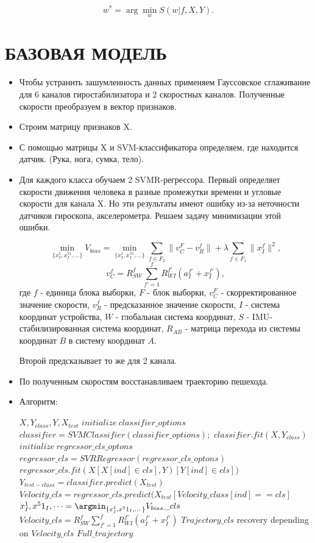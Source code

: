 \documentclass[letterpaper, 10 pt, conference]{ieeeconf}  %
\begin{document}
\[w^* = \arg\min_{w}S(w|f, X, Y).\]


\section{БАЗОВАЯ МОДЕЛЬ}
\begin{itemize}

\item Чтобы устранить зашумленность данных применяем Гауссовское сглаживание для 6 каналов гиростабилизатора и 2 скоростных каналов. Полученные скорости преобразуем в вектор признаков.
\item Строим матрицу признаков X.
\item С помощью матрицы X и SVM-классификатора определяем, где находится датчик. (Рука, нога, сумка, тело).
\item Для каждого класса обучаем 2 SVMR-регрессора. Первый определяет скорости движения человека в разные промежутки времени и угловые скорости для канала X. Но эти результаты имеют ошибку из-за неточности датчиков гироскопа, акселерометра. Решаем задачу минимизации этой ошибки.

\[\min_{\{x^1_I, x^51_I,\dots\}}V_{bias}=
\min_{\{x^1_I, x^51_I,\dots\}}\sum_{f \in F_2}\|v_C^F-v_R^f\|+
\lambda\sum_{f \in F_1}\|x^f_I\|^2,\]
\[v_C^f = R_{SW}^f\sum_{f'=1}^f R_{WI}^{f'}(a_I^{f'}+x_I^{f'}),\]
где $f$ - единица блока выборки, $F$ - блок выборки, $v_C^F$ - скорректированное значение скорости, $v_R^f$ - предсказанное значение скорости, $I$ - система координат устройства, $W$ - глобальная система координат, $S$ - IMU-стабилизированная система координат, $R_{AB}$ - матрица перехода из системы координат $B$ в систему координат $A$.

Второй предсказывает то же для 2 канала.

\item По полученным скоростям восстанавливаем траекторию пешехода.
\item Алгоритм:

\begin{algorithmic}[1]
\REQUIRE $X, Y_{class}, Y, X_{test}$
\STATE $initialize ~ classifier\_options$
\STATE $classifier = SVMClassifier(classifier\_options);$
\STATE $classifier.fit(X, Y_{class})$
\STATE $initialize ~ regressor\_cls\_optons$
\STATE $regressor\_cls = SVRRegressor(regressor\_cls\_optons)$
\STATE $regressor\_cls.fit(X[X[ind] \in cls], Y)[Y[ind] \in cls])$
\ENDFOR
\STATE $Y_{test-class} = classifier.predict(X_{test})$
\STATE $Velocity\_cls = regressor\_cls.predict(X_{test} [Velocity\_class[ind] == cls]$
\STATE $x^1_I, x^51_I,\dots = \argmin_{\{x^1_I, x^51_I,\dots\}}V_{bias}\_cls$
\STATE $Velocity\_cls = R_{SW}^f\sum_{f'=1}^f R_{WI}^{f'}(a_I^{f'}+x_I^{f'})$
\STATE $Trajectory\_cls$ recovery depending on $Velocity\_cls$
\ENDFOR
\RETURN $Full\_trajectory$
\end{algorithmic}

\end{itemize}
\end{document}
